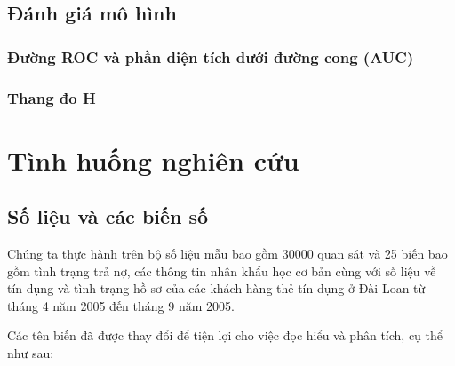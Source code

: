 \documentclass[a4paper]{report}\usepackage[]{graphicx}\usepackage[]{color}
\begin{document}
\section{Đánh giá mô hình}
\subsection{Đường ROC và phần diện tích dưới đường cong (AUC)}
\subsection{Thang đo H}


\chapter{Tình huống nghiên cứu}

\section{Số liệu và các biến số}


Chúng ta thực hành trên bộ số liệu mẫu bao gồm 30000 quan sát và 25 biến bao gồm tình trạng trả nợ, các thông tin nhân khẩu học cơ bản cùng với số liệu về tín dụng và tình trạng hồ sơ của các khách hàng thẻ tín dụng ở Đài Loan từ tháng 4 năm 2005 đến tháng 9 năm 2005.

Các tên biến đã được thay đổi để tiện lợi cho việc đọc hiểu và phân tích, cụ thể như sau:
\end{document}
